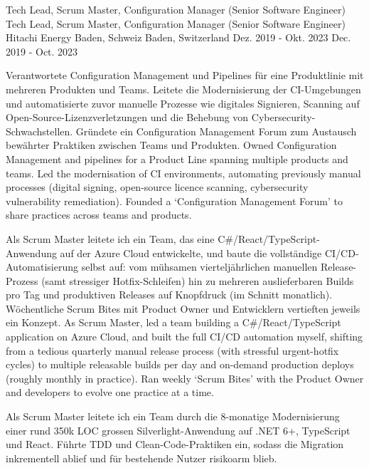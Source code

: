 \begin{cventries}
	\cventry
	{
			{ Tech Lead, Scrum Master, Configuration Manager (Senior Software Engineer) }
			{ Tech Lead, Scrum Master, Configuration Manager (Senior Software Engineer) }
	} %
	{Hitachi Energy} %
	{
			{ Baden, Schweiz }
			{ Baden, Switzerland }
	} %
	{
			{ Dez. 2019 - Okt. 2023 }
			{ Dec. 2019 - Oct. 2023 }
	} %
	{
		\begin{cvitems}
			\item {
				{
					Verantwortete Configuration Management und Pipelines für eine Produktlinie mit mehreren Produkten und Teams. Leitete die Modernisierung der CI-Umgebungen und automatisierte zuvor manuelle Prozesse wie digitales Signieren, Scanning auf Open-Source-Lizenzverletzungen und die Behebung von Cybersecurity-Schwachstellen. Gründete ein \glqq Configuration Management Forum\grqq{} zum Austausch bewährter Praktiken zwischen Teams und Produkten.
				}
				{
					Owned Configuration Management and pipelines for a Product Line spanning multiple products and teams. Led the modernisation of CI environments, automating previously manual processes (digital signing, open-source licence scanning, cybersecurity vulnerability remediation). Founded a `Configuration Management Forum' to share practices across teams and products.
				}
			}
			\item {
				{
					Als Scrum Master leitete ich ein Team, das eine C\#/React/TypeScript-Anwendung auf der Azure Cloud entwickelte, und baute die vollständige CI/CD-Automatisierung selbst auf: vom mühsamen vierteljährlichen manuellen Release-Prozess (samt stressiger Hotfix-Schleifen) hin zu mehreren auslieferbaren Builds pro Tag und produktiven Releases auf Knopfdruck (im Schnitt monatlich). Wöchentliche \glqq Scrum Bites\grqq{} mit Product Owner und Entwicklern vertieften jeweils ein Konzept.
				}
				{
					As Scrum Master, led a team building a C\#/React/TypeScript application on Azure Cloud, and built the full CI/CD automation myself, shifting from a tedious quarterly manual release process (with stressful urgent-hotfix cycles) to multiple releasable builds per day and on-demand production deploys (roughly monthly in practice). Ran weekly `Scrum Bites' with the Product Owner and developers to evolve one practice at a time.
				}
			}
			\item {
				{
					Als Scrum Master leitete ich ein Team durch die 8-monatige Modernisierung einer rund 350k LOC grossen Silverlight-Anwendung auf .NET 6+, TypeScript und React. Führte TDD und Clean-Code-Praktiken ein, sodass die Migration inkrementell ablief und für bestehende Nutzer risikoarm blieb.
}}
\end{cvitems}}
\end{cventries}
